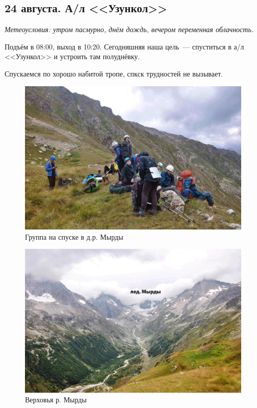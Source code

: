 \subsection{24 августа. А/л <<Узункол>>}
\textit{Метеоусловия: утром пасмурно, днём дождь, вечером переменная облачность.}

Подъём в 08:00, выход в 10:20. Сегодняшняя наша цель~--- спуститься в а/л <<Узункол>> и устроить там полуднёвку.

Спускаемся по хорошо  набитой тропе, спкск трудностей не вызывает.
\begin{figure}[h!]
	\centering
	\includegraphics[width=0.7\linewidth]{../pics/DSC_0104.jpg}
	\caption{Группа на спуске в д.р. Мырды}
	\label{fig:DSC_0104.jpg}
\end{figure}

\begin{figure}[h!]
	\centering
	\includegraphics[width=0.7\linewidth]{../pics/DSC_0107.jpg}
	\caption{Верховья р. Мырды}
	\label{fig:DSC_0107.jpg}
\end{figure}


\newpage